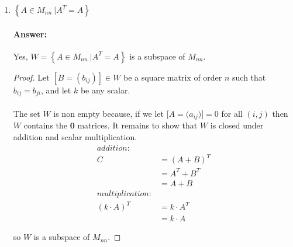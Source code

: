 \documentclass[12pt]{article}
\newcommand{\DS} [1] {${\displaystyle #1}$}
\begin{document}
\begin{enumerate}
\begin{enumerate}
\begin{proof}
\begin{align*}
                                                            & = 0
                                    \end{align*}
                                    To be clear, if we take some $C = A+B$ such that A and B are in $W$,
                                    then for all $C = (c_{ii})$, the sum will be $0$, so $C$ is also in $W$.
                                    Therefore $W$ is a subspace of $M_{nn}$.
                            \end{proof}
                      \item \DS{ \left\{A \in{M_{nn}} \ | A^T = A \right\}}
                            \paragraph{Answer:} Yes, $W={ \left\{A \in{M_{nn}} \ |
                                    A^T = A \right\}}$ is a subspace of $M_{nn}$.
                            \begin{proof}
                                    Let $[B = (b_{ij})]\in W$ be a square matrix of order $n$
                                    such that $b_{ij} = b_{ji}$, and let ${k}$ be any scalar.\\\\
                                    The set $W$ is non empty because, if we let $[A=({a_{ij})]=0}$
                                    for all $(i,j)$ then $W$ contains the $\mathbf{0}$ matrices.
                                    It remains to show that $W$ is closed under addition and scalar multiplication.
                                    \begin{align*}
                                            addition:       &                \\
                                            C               & = (A+B)^T      \\
                                                            & = A^T+B^T      \\
                                                            & = A + B        \\
                                            multiplication: &                \\
                                            (k\cdot A)^{T}  & = k\cdot A^{T} \\
                                                            & = k\cdot A
                                    \end{align*}

                                    so $W$ is a subspace of $M_{nn}$.
                            \end{proof}
              \end{enumerate}
\end{enumerate}
\end{document}
